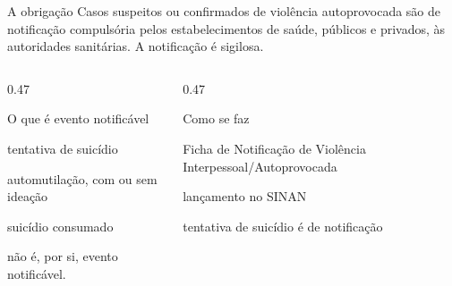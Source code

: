 
\begin{frame}{}
\begin{caixanorma}{A obriga\c{c}\~ao}
Casos suspeitos ou confirmados de viol\^encia autoprovocada s\~ao de
notifica\c{c}\~ao compuls\'oria pelos estabelecimentos de sa\'ude, p\'ublicos
e privados, \`as autoridades sanit\'arias. A notifica\c{c}\~ao \'e sigilosa.
\end{caixanorma}

\CRvg
\begin{columns}[onlytextwidth, t]
\begin{column}{0.47\textwidth}
\begin{caixanorma}{O que \'e evento notific\'avel}
\begin{itemc}
\item tentativa de suic\'idio
\item automutila\c{c}\~ao, com ou sem idea\c{c}\~ao
\item suic\'idio consumado
\end{itemc}
\vspace{0.06cm}
 n\~ao \'e, por si, evento notific\'avel.
\end{caixanorma}
\end{column}
\calha
\begin{column}{0.47\textwidth}
\begin{caixanorma}{Como se faz}
\begin{itemc}
\item Ficha de Notifica\c{c}\~ao de Viol\^encia Interpessoal\slash Autoprovocada
\item lan\c{c}amento no SINAN
\item tentativa de suic\'idio \'e de notifica\c{c}\~ao 
\end{itemc}
\end{caixanorma}
\end{column}
\end{columns}

\end{frame}

